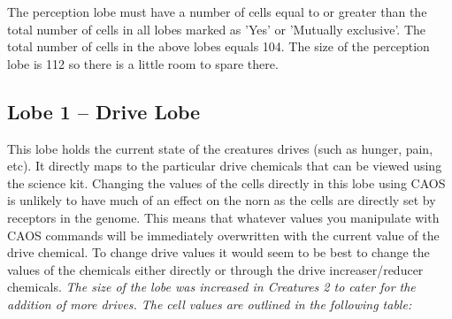 \documentclass[11pt,twoside,a4paper]{article}
\begin{document}
\clearpage

The perception lobe must have a number of cells equal to or greater than the total number of cells in all lobes marked as 'Yes' or 'Mutually exclusive'. The total number of cells in the above lobes equals 104. The size of the perception lobe is 112 so there is a little room to spare there.

\subsection{Lobe 1 -- Drive Lobe}

This lobe holds the current state of the creatures drives (such as hunger, pain, etc). It directly maps to the particular drive chemicals that can be viewed using the science kit. Changing the values of the cells directly in this lobe using CAOS is unlikely to have much of an effect on the norn as the cells are directly set by receptors in the genome. This means that whatever values you manipulate with CAOS commands will be immediately overwritten with the current value of the drive chemical. To change drive values it would seem to be best to change the values of the chemicals either directly or through the drive increaser/reducer chemicals. \emph{The size of the lobe was increased in Creatures 2 to cater for the addition of more drives. The cell values are outlined in the following table:}
\end{document}
